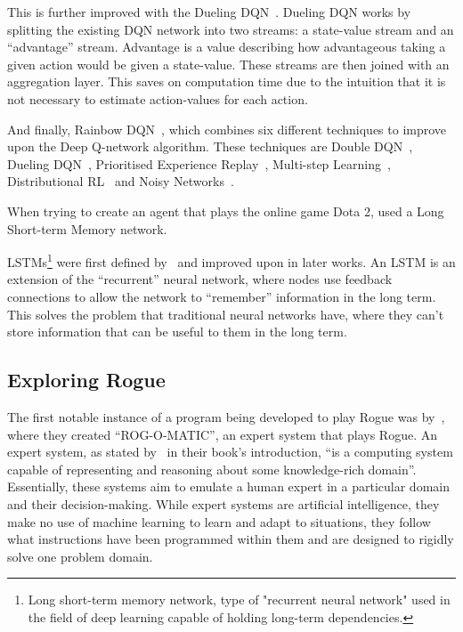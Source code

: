 \documentclass[12pt,a4paper]{article}
\begin{document}
    This is further improved with the Dueling DQN~\citep{wang16}.
    Dueling DQN works by splitting the existing DQN network into two streams: a state-value stream and an ``advantage'' stream.
    Advantage is a value describing how advantageous taking a given action would be given a state-value.
    These streams are then joined with an aggregation layer.
    This saves on computation time due to the intuition that it is not necessary to estimate action-values for each action.

    And finally, Rainbow DQN~\citep{hessel17}, which combines six different techniques to improve upon the Deep Q-network algorithm.
    These techniques are Double DQN~\citep{hasselt15}, Dueling DQN~\citep{wang16}, Prioritised Experience Replay~\citep{schaul16},
    Multi-step Learning~\citep[chap.~7.1]{sutton18}, Distributional RL~\citep{bellemare17} and Noisy Networks~\citep{fortunato19}.

    When trying to create an agent that plays the online game Dota 2, \citet{berner19} used a Long Short-term Memory network.

    LSTMs\footnote{Long short-term memory network, type of "recurrent neural network" used in the field of deep learning capable of holding long-term dependencies.} were first defined by~\citet{hochreiter97} and improved upon in later works.
    An LSTM is an extension of the ``recurrent'' neural network, where nodes use feedback connections to allow the network to ``remember'' information in the long term.
    This solves the problem that traditional neural networks have, where they can't store information that can be useful to them in the long term.

    \subsection{Exploring Rogue}\label{subsec:exploring-rogue}
    The first notable instance of a program being developed to play Rogue was by~\citet{mauldin83}, where they created ``ROG-O-MATIC'', an expert system that plays Rogue.
    An expert system, as stated by~\citet{jackson86} in their book's introduction, ``is a computing system capable of representing and reasoning about some knowledge-rich domain''.
    Essentially, these systems aim to emulate a human expert in a particular domain and their decision-making.
    While expert systems are artificial intelligence, they make no use of machine learning to learn and adapt to situations, they follow what instructions have been programmed within them and are designed to rigidly solve one problem domain.
\end{document}
